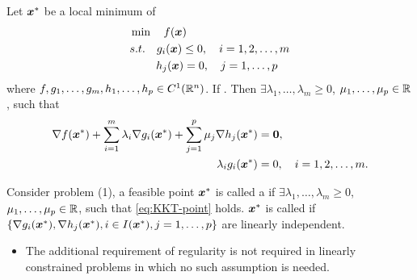 \documentclass[10pt,a4paper]{article}
\begin{document}
\begin{thmbox}
	\begin{theorem}\label{thm:KKT-ineq_eq_constrained}
		Let ${\boldsymbol x}^*$ be a local minimum of 
		\begin{equation}\label{eq:KKT-ineq_eq}
			\begin{aligned}
				&\min\quad  f({\boldsymbol x})\\
				&s.t.\quad  g_i({\boldsymbol x})\leq0,\quad i=1,2,\ldots,m\\
				&\quad\quad\ h_j({\boldsymbol x})=0,\quad j=1,\ldots,p
				\end{aligned}	
		\end{equation}
		where $f,g_1,\ldots,g_m,h_1,\ldots,h_p\in C^1(\mathbb R^n)$. If . Then $\exists \lambda_1,\ldots,\lambda_m\geq 0$, $\mu_1,\ldots,\mu_p\in\mathbb R$,  such that 
		\begin{equation}\label{eq:KKT-point}
			\begin{aligned}
				\nabla f({\boldsymbol x}^*)+\sum_{i=1}^m\lambda_i\nabla g_i({\boldsymbol x}^*) + \sum_{j=1}^{p}\mu_j\nabla h_j({\boldsymbol x}^*)& ={\boldsymbol 0}, \\
				\lambda_ig_i({\boldsymbol x}^*)& =0, \quad i=1,2,\ldots,m.
			\end{aligned} 
		\end{equation} 
	\end{theorem}	
\end{thmbox}
Consider problem (1), a feasible point ${\boldsymbol x}^*$ is called a 
if $\exists \lambda_1,\ldots,\lambda_m\geq 0$, $\mu_1,\ldots,\mu_p\in\mathbb R$, such that \eqref{eq:KKT-point} holds. ${\boldsymbol x}^*$ is called  if $\{\nabla g_i({\boldsymbol x}^*),\nabla h_j({\boldsymbol x}^*),i\in I({\boldsymbol x}^*),j=1,\ldots,p\}$ are linearly independent.
\begin{itemize}
	\item The additional requirement of regularity is not required in linearly
	constrained problems in which no such assumption is needed.
\end{itemize}










\end{document}
